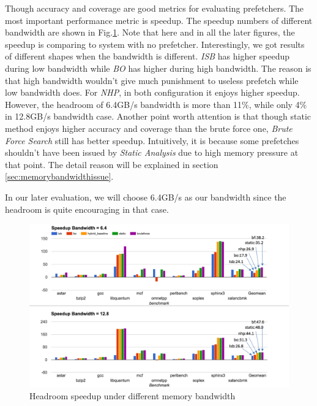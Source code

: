   Though accuracy and coverage are good metrics for evaluating prefetchers. The most important performance metric is speedup. The speedup numbers of different bandwidth are shown in Fig.\ref{fig:headroom_speedup}. Note that here and in all the later figures, the speedup is comparing to system with no prefetcher. Interestingly, we got results of different shapes when the bandwidth is different. \emph{ISB} has higher speedup during low bandwidth while \emph{BO} has higher during high bandwidth. The reason is that high bandwidth wouldn't give much punishment to useless prefetch while low bandwidth does. For \emph{NHP}, in both configuration it enjoys higher speedup. However, the headroom of 6.4GB/s bandwidth is more than 11\%, while only 4\% in 12.8GB/s bandwidth case. Another point worth attention is that though static method enjoys higher accuracy and coverage than the brute force one, \emph{Brute Force Search} still has better speedup. Intuitively, it is because some prefetches shouldn't have been issued by \emph{Static Analysis} due to high memory pressure at that point. The detail reason will be explained in section \ref{sec:memorybandwidthissue}.

  In our later evaluation, we will choose 6.4GB/s as our bandwidth since the headroom is quite encouraging in that case.


  \begin{figure}[ht!]
	   \centering
	   \includegraphics[width=1.0\textwidth]{images/headroom_speedup.png}
	   \caption{Headroom speedup under different memory bandwidth}
	  \label{fig:headroom_speedup}
  \end{figure}

